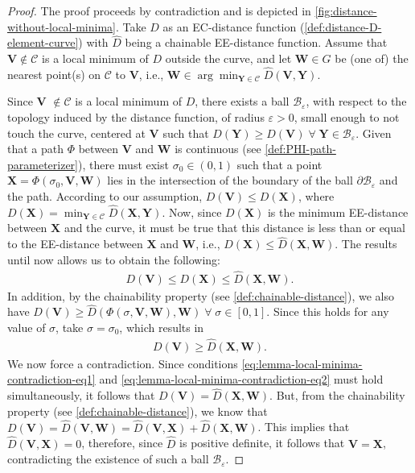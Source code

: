 \begin{proof}
    The proof proceeds by contradiction and is depicted in \cref{fig:distance-without-local-minima}. Take $D$ as an EC-distance function (\cref{def:distance-D-element-curve}) with $\widehat{D}$ being a chainable EE-distance function. Assume that $\mathbf{V}\notin\mathcal{C}$ is a local minimum of $D$ outside the curve, and let $\mathbf{W} \in G$ be (one of) the nearest point(s) on $\mathcal{C}$ to $\mathbf{V}$, i.e., $\mathbf{W}\in\arg\min_{\mathbf{Y}\in\mathcal{C}}\widehat{D}(\mathbf{V}, \mathbf{Y})$.

     Since $\mathbf{V}$ $\not \in \mathcal{C}$ is a local minimum of $D$, there exists a ball $\mathcal{B}_\varepsilon$, with respect to the topology induced by the distance function, of radius $\varepsilon>0$, small enough to not touch the curve, centered at $\mathbf{V}$ such that $D(\mathbf{Y}) \ge D(\mathbf{V})\; \forall\; \mathbf{Y} \in \mathcal{B}_\varepsilon$. Given that a path $\Phi$ between $\mathbf{V}$ and $\mathbf{W}$ is continuous (see \cref{def:PHI-path-parameterizer}), there must exist $\sigma_0 \in (0,1)$ such that a point $\mathbf{X}=\Phi(\sigma_0, \mathbf{V}, \mathbf{W})$ lies in the intersection of the boundary of the ball $\partial\mathcal{B}_\varepsilon$ and the path. According to our assumption, $D(\mathbf{V}) \le D(\mathbf{X})$, where $D(\mathbf{X}) = \min_{\mathbf{Y}\in\mathcal{C}} \widehat{D}(\mathbf{X}, \mathbf{Y})$. Now, since $D(\mathbf{X})$ is the minimum EE-distance between $\mathbf{X}$ and the curve, it must be true that this distance is less than or equal to the EE-distance between $\mathbf{X}$ and $\mathbf{W}$, i.e., $D(\mathbf{X})\le \widehat{D}(\mathbf{X}, \mathbf{W})$. The results until now allows us to obtain the following:
     \begin{align}
         D(\mathbf{V}) \le D(\mathbf{X}) \le \widehat{D}(\mathbf{X}, \mathbf{W}). \label{eq:lemma-local-minima-contradiction-eq1}
     \end{align}
    In addition, by the chainability property (see \cref{def:chainable-distance}), we also have $D(\mathbf{V}) \ge \widehat{D}(\Phi(\sigma, \mathbf{V}, \mathbf{W}), \mathbf{W})\;\forall\;\sigma\in[0,1]$. Since this holds for any value of $\sigma$, take $\sigma=\sigma_0$, which results in 
    \begin{align}
        D(\mathbf{V}) \ge \widehat{D}(\mathbf{X}, \mathbf{W}). \label{eq:lemma-local-minima-contradiction-eq2}
    \end{align}
    We now force a contradiction. Since conditions \eqref{eq:lemma-local-minima-contradiction-eq1} and \eqref{eq:lemma-local-minima-contradiction-eq2} must hold simultaneously, it follows that $D(\mathbf{V}) = \widehat{D}(\mathbf{X}, \mathbf{W})$. But, from the chainability property (see \cref{def:chainable-distance}), we know that $D(\mathbf{V}) = \widehat{D}(\mathbf{V}, \mathbf{W}) = \widehat{D}(\mathbf{V}, \mathbf{X}) + \widehat{D}(\mathbf{X}, \mathbf{W})$. This implies that $\widehat{D}(\mathbf{V}, \mathbf{X})=0$, therefore, since $\widehat{D}$ is positive definite, it follows that $\mathbf{V}=\mathbf{X}$, contradicting the existence of such a ball $\mathcal{B}_\varepsilon$. 
\end{proof}

